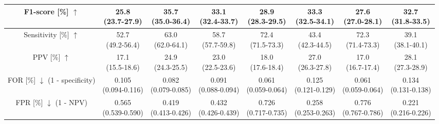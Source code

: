 {\begin{table}[h]
{\begin{tabular}{c|c|cc|cc|cc}
        F1-score [\%] $\uparrow$ & \makecell{25.8 \\ (23.7-27.9)} & \makecell{35.7 \\ (35.0-36.4)} & \makecell{33.1 \\ (32.4-33.7)} & \makecell{28.9 \\ (28.3-29.5)} & \makecell{33.3 \\ (32.5-34.1)} & \makecell{27.6 \\ (27.0-28.1)} & \makecell{32.7 \\ (31.8-33.5)} \\
        \midrule
        Sensitivity [\%] $\uparrow$ & \makecell{52.7 \\ (49.2-56.4)} & \makecell{63.0 \\ (62.0-64.1)} & \makecell{58.7 \\ (57.7-59.8)} & \makecell{72.4 \\ (71.5-73.3)} & \makecell{43.4 \\ (42.3-44.5)} & \makecell{72.3 \\ (71.4-73.3)} & \makecell{39.1 \\ (38.1-40.1)} \\
        \midrule
        PPV [\%] $\uparrow$ & \makecell{17.1 \\ (15.5-18.6)} & \makecell{24.9 \\ (24.3-25.5)} & \makecell{23.0 \\ (22.5-23.6)} & \makecell{18.0 \\ (17.6-18.4)} & \makecell{27.0 \\ (26.3-27.8)} & \makecell{17.0 \\ (16.7-17.4)} & \makecell{28.1 \\ (27.3-28.9)} \\
        \midrule
        \makecell[l]{FOR [\%] $\downarrow$ \\ (1 - specificity)} & \makecell{0.105 \\ (0.094-0.116)} & \makecell{0.082 \\ (0.079-0.085)} & \makecell{0.091 \\ (0.088-0.094)} & \makecell{0.061 \\ (0.059-0.064)} & \makecell{0.125 \\ (0.121-0.129)} & \makecell{0.061 \\ (0.059-0.064)} & \makecell{0.134 \\ (0.131-0.138)} \\
        \midrule
        \makecell[l]{FPR [\%] $\downarrow$ \\ (1 - NPV)} & \makecell{0.565 \\ (0.539-0.590)} & \makecell{0.419 \\ (0.413-0.426)} & \makecell{0.432 \\ (0.426-0.439)} & \makecell{0.726 \\ (0.717-0.735)} & \makecell{0.258 \\ (0.253-0.263)} & \makecell{0.776 \\ (0.767-0.786)} & \makecell{0.221 \\ (0.216-0.226)} \\


\end{tabular}}
\end{table}}
